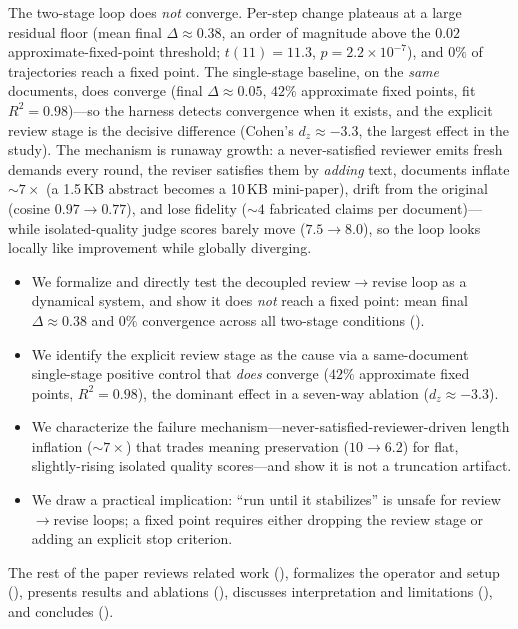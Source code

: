  The two-stage loop does \emph{not} converge. Per-step change plateaus
at a large residual floor (mean final $\Delta \approx 0.38$, an order of magnitude above the
$0.02$ approximate-fixed-point threshold; $t(11)=11.3$, $p=2.2\times10^{-7}$), and $0\%$ of
trajectories reach a fixed point. The single-stage baseline, on the \emph{same} documents,
does converge (final $\Delta \approx 0.05$, $42\%$ approximate fixed points, fit
$R^2=0.98$)---so the harness detects convergence when it exists, and the explicit review
stage is the decisive difference (Cohen's $d_z \approx -3.3$, the largest effect in the
study). The mechanism is runaway growth: a never-satisfied reviewer emits fresh demands
every round, the reviser satisfies them by \emph{adding} text, documents inflate $\sim 7\times$
(a 1.5\,KB abstract becomes a 10\,KB mini-paper), drift from the original (cosine
$0.97\to0.77$), and lose fidelity ($\sim 4$ fabricated claims per document)---while
isolated-quality judge scores barely move ($7.5\to 8.0$), so the loop looks locally like
improvement while globally diverging.

\begin{itemize}[leftmargin=*,itemsep=0pt,topsep=0pt]
    \item We formalize and directly test the decoupled review$\to$revise loop as a
    dynamical system, and show it does \emph{not} reach a fixed point: mean final
    $\Delta \approx 0.38$ and $0\%$ convergence across all two-stage conditions
    ().
    \item We identify the explicit review stage as the cause via a same-document single-stage
    positive control that \emph{does} converge ($42\%$ approximate fixed points,
    $R^2=0.98$), the dominant effect in a seven-way ablation ($d_z\approx-3.3$).
    \item We characterize the failure mechanism---never-satisfied-reviewer-driven length
    inflation ($\sim 7\times$) that trades meaning preservation ($10\to 6.2$) for flat,
    slightly-rising isolated quality scores---and show it is not a truncation artifact.
    \item We draw a practical implication: ``run until it stabilizes'' is unsafe for
    review$\to$revise loops; a fixed point requires either dropping the review stage or
    adding an explicit stop criterion.
\end{itemize}

The rest of the paper reviews related work (), formalizes the operator
and setup (), presents results and ablations (),
discusses interpretation and limitations (), and concludes
().

